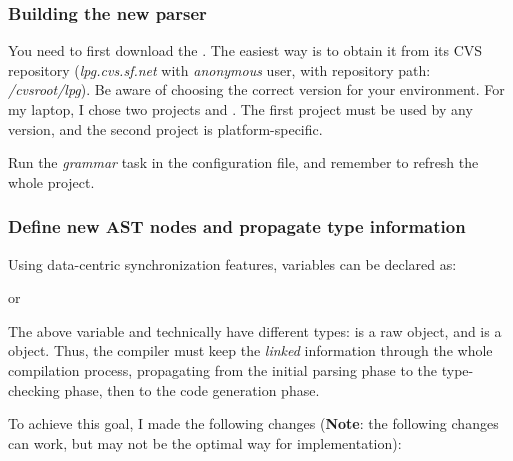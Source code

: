 \documentclass{article}
\begin{document}
\subsubsection{Building the new parser}

You need to first download the . The easiest way is to obtain it from its CVS repository (\textit{lpg.cvs.sf.net} with \textit{anonymous} user, with repository path: \textit{/cvsroot/lpg}).
Be aware of choosing the correct version for your environment. For my laptop, I chose two projects  and . The first project must be used by any version, and the second project is platform-specific.

Run the \textit{grammar} task in the  configuration file, and remember to refresh the whole project.

\subsubsection{Define new AST nodes and propagate type information}


Using data-centric synchronization features, variables can be declared as:


or


The above variable  and   technically have different types:  is a raw  object, and  is a  object. Thus,  the compiler must
keep the \textit{linked} information through the whole compilation process,  propagating from the initial parsing phase to the  type-checking phase, then to the code generation phase.

To achieve this goal, I made the following changes (\textbf{Note}: the following changes can work,  but may not be the optimal way for implementation):
\end{document}
